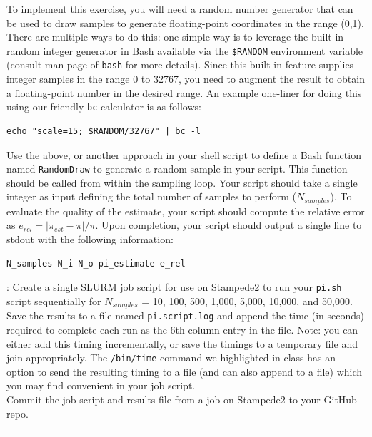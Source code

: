 \documentclass[letterpaper,12pt]{article}
\begin{document}
{To implement this exercise, you will need a random number generator
that can be used to draw samples to generate floating-point coordinates
in the range (0,1).  There are multiple ways to do this: one simple
way is to leverage the built-in random integer generator in Bash
available via the \texttt{\$RANDOM} environment variable (consult man
page of \texttt{bash} for more details). Since this built-in feature
supplies integer samples in the range 0 to 32767, you need to augment
the result to obtain a floating-point number in the desired range. An
example one-liner for doing this using our friendly \texttt{bc}
calculator is as follows:

\begin{verbatim}
echo "scale=15; $RANDOM/32767" | bc -l
\end{verbatim}

Use the above, or another approach in your shell script to define a
Bash function named \texttt{RandomDraw} to generate a random sample in
your script. This function should be called from within the sampling
loop. Your script should take a single integer as input defining the
total number of samples to perform ($N_{samples}$). To evaluate the
quality of the estimate, your script should compute the relative error
as $e_{rel} = |\pi_{est} - \pi|/\pi$. Upon completion, your script
should output a single line to stdout with the following information:

\begin{verbatim}
N_samples N_i N_o pi_estimate e_rel
\end{verbatim}

{}: Create a single SLURM job script for use on
Stampede2 to run your \texttt{pi.sh} script sequentially for
$N_{samples}$ = 10, 100, 500, 1,000, 5,000, 10,000, and 50,000.  Save
the results to a file named \texttt{pi.script.log} and append the time
(in seconds) required to complete each run as the 6th column entry in
the file. Note: you can either add this timing incrementally, or save
the timings to a temporary file and join appropriately. The
\texttt{/bin/time} command we highlighted in class has an option to
send the resulting timing to a file (and can also append to a file)
which you may find convenient in your job script. \\

\noindent Commit the job script and results file from a job on Stampede2 to your
GitHub repo. 

\noindent\rule{2cm}{0.4pt}  \\

}
\end{document}
